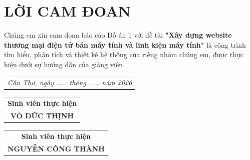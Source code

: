 \chapter*{LỜI CAM ĐOAN}
\vspace{-15pt} %
Chúng em xin cam đoan báo cáo Đồ án 1 với đề tài \textbf{"Xây dựng website thương mại điện tử bán máy tính và linh kiện máy tính"} là công trình tìm hiểu, phân tích và thiết kế hệ thống của riêng nhóm chúng em, được thực hiện dưới sự hướng dẫn của giảng viên.

\vfill %

\noindent\hfill
\begin{tabular}{@{}c@{}}
    \textit{Cần Thơ, ngày ..... tháng ..... năm 2026}
\end{tabular}

\vspace{0.2cm}

\noindent
\begin{tabular}{@{}c@{}}
    \textbf{Sinh viên thực hiện} \\[2cm]
    \textbf{VÕ ĐỨC THỊNH}
\end{tabular}
\hfill
\begin{tabular}{@{}c@{}}
    \textbf{Sinh viên thực hiện} \\[2cm]
    \textbf{NGUYỄN CÔNG THÀNH}
\end{tabular}
